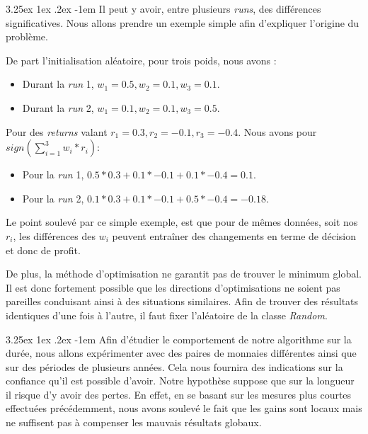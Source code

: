 \documentclass[a4paper, 11pt]{article}
\makeatletter
\renewcommand\paragraph{\@startsection{paragraph}{5}{\z@}%
  {3.25ex \@plus1ex \@minus.2ex}%
  {-1em}%
  {\normalfont\normalsize\bfseries}}
\makeatother
\begin{document}
\clearpage

\paragraph{}
Il peut y avoir, entre plusieurs \textit{runs}, des différences significatives. Nous allons prendre un exemple simple afin d'expliquer l'origine du problème.

De part l'initialisation aléatoire, pour trois poids, nous avons :
\begin{itemize}
	\item Durant la \textit{run} 1, $w_1=0.5,w_2=0.1,w_3=0.1$.
	\item Durant la \textit{run} 2, $w_1=0.1,w_2=0.1,w_3=0.5$.
\end{itemize}

Pour des \textit{returns} valant $r_1=0.3,r_2=-0.1,r_3=-0.4$. Nous avons pour $sign(\sum_{i=1}^{3}w_i * r_i)$:
\begin{itemize}
	\item Pour la \textit{run} 1, $0.5 * 0.3 + 0.1 * -0.1 + 0.1 * -0.4 = 0.1$.
	\item Pour la \textit{run} 2, $0.1 * 0.3 + 0.1 * -0.1 + 0.5 * -0.4 = -0.18$.
\end{itemize}

Le point soulevé par ce simple exemple, est que pour de mêmes données, soit nos $r_i$, les différences des $w_i$ peuvent entraîner des changements en terme de décision et donc de profit.

De plus, la méthode d'optimisation ne garantit pas de trouver le minimum global. Il est donc fortement possible que les directions d'optimisations ne soient pas pareilles conduisant ainsi à des situations similaires. Afin de trouver des résultats identiques d'une fois à l'autre, il faut fixer l'aléatoire de la classe \textit{Random}.
 

\paragraph{}
Afin d'étudier le comportement de notre algorithme sur la durée, nous allons expérimenter avec des paires de monnaies différentes ainsi que sur des périodes de plusieurs années. Cela nous fournira des indications sur la confiance qu'il est possible d'avoir. Notre hypothèse suppose que sur la longueur il risque d'y avoir des pertes. En effet, en se basant sur les mesures plus courtes effectuées précédemment, nous avons soulevé le fait que les gains sont locaux mais ne suffisent pas à compenser les mauvais résultats globaux.
\end{document}
